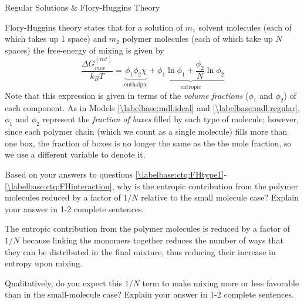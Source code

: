\begin{activity}{Regular Solutions \& Flory-Huggins Theory}
\begin{ctqs}
\begin{enumerate}
		\end{enumerate}
	
\end{ctqs}

\begin{infobox}
	Flory-Huggins theory states that for a solution of $m_1$ solvent molecules (each of which takes up 1 space) and $m_2$ polymer molecules (each of which take up $N$ spaces) the free-energy of mixing is given by
	\begin{equation*}
		\frac{\Delta G_{mix}^{(int)}}{k_B T} = \underbrace{\phi_1 \phi_2 \chi}_{\text{enthalpic}} + \underbrace{\phi_1 \ln \phi_1 + \frac{\phi_2}{N} \ln \phi_2}_{\text{entropic}}
	\end{equation*}
	Note that this expression is given in terms of the \emph{volume fractions} ($\phi_1$ and $\phi_2$) of each component.  As in Models \ref{\labelbase:mdl:ideal} and \ref{\labelbase:mdl:regular}, $\phi_1$ and $\phi_2$ represent the \emph{fraction of boxes} filled by each type of molecule; however, since each polymer chain (which we count as a single molecule) fills more than one box, the fraction of boxes is no longer the same as the the mole fraction, so we use a different variable to denote it.
	
\end{infobox}

\begin{ctqs}

		\question Based on your answers to questions \ref{\labelbase:ctq:FHtype1}-\ref{\labelbase:ctq:FHinteraction}, why is the entropic contribution from the polymer molecules reduced by a factor of $1/N$ relative to the small molecule case? Explain your answer in 1-2 complete sentences.
		
			\begin{solution}[1.75in]{}
			
				The entropic contribution from the polymer molecules is reduced by a factor of $1/N$ because linking the monomers together reduces the number of ways that they can be distributed in the final mixture, thus reducing their increase in entropy upon mixing.
			
			\end{solution}
		
		\question Qualitatively, do you expect this $1/N$ term to make mixing more or less favorable than in the small-molecule case?  Explain your answer in 1-2 complete sentences.
		
			\begin{solution}[2in]{}
			

\end{solution}
\end{ctqs}
\end{activity}
